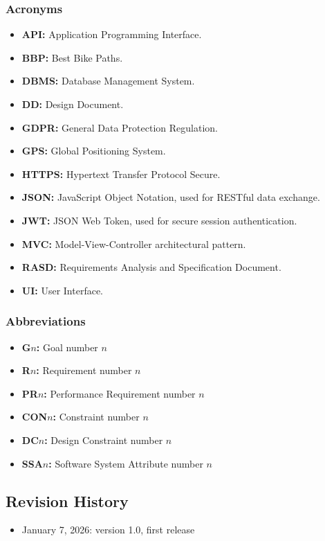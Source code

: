\subsubsection{Acronyms}
\begin{itemize}
    \item \textbf{API:} Application Programming Interface.
    \item \textbf{BBP:} Best Bike Paths.
    \item \textbf{DBMS:} Database Management System.
    \item \textbf{DD:} Design Document.
    \item \textbf{GDPR:} General Data Protection Regulation.
    \item \textbf{GPS:} Global Positioning System.
    \item \textbf{HTTPS:} Hypertext Transfer Protocol Secure.
    \item \textbf{JSON:} JavaScript Object Notation, used for RESTful data exchange.
    \item \textbf{JWT:} JSON Web Token, used for secure session authentication.
    \item \textbf{MVC:} Model-View-Controller architectural pattern.
    \item \textbf{RASD:} Requirements Analysis and Specification Document.
    \item \textbf{UI:} User Interface.
\end{itemize}

\subsubsection{Abbreviations}
\begin{itemize}
    \item \textbf{G$n$:} Goal number $n$
    \item \textbf{R$n$:} Requirement number $n$
    \item \textbf{PR$n$:} Performance Requirement number $n$
    \item \textbf{CON$n$:} Constraint number $n$
    \item \textbf{DC$n$:} Design Constraint number $n$
    \item \textbf{SSA$n$:} Software System Attribute number $n$
\end{itemize}

\subsection{Revision History}
\begin{itemize}
    \item January 7, 2026: version 1.0, first release
\end{itemize}

